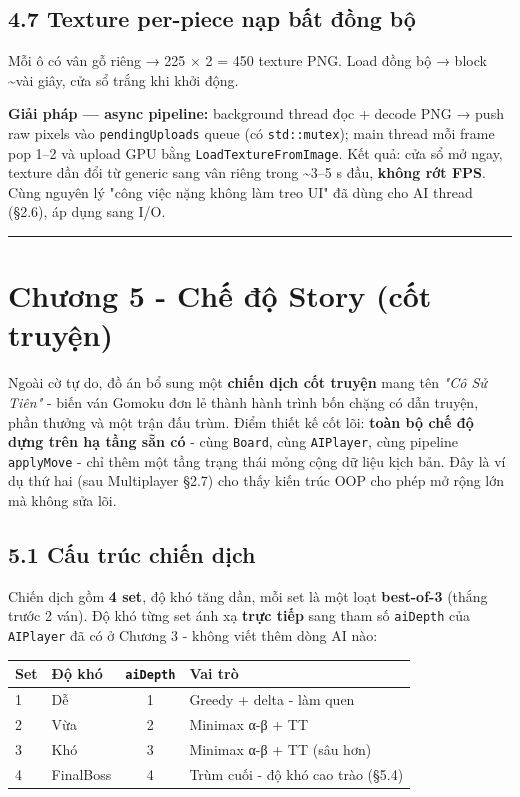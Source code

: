 \documentclass[11pt,a4paper]{article}
\begin{document}
\subsection{4.7 Texture per-piece nạp bất đồng bộ}
\label{sec:org3184ddc}

Mỗi ô có vân gỗ riêng → 225 × 2 = 450 texture PNG. Load đồng bộ → block \textasciitilde{}vài giây, cửa sổ trắng khi khởi động.

\textbf{Giải pháp — async pipeline:} background thread đọc + decode PNG → push raw pixels vào \texttt{pendingUploads} queue (có \texttt{std::mutex}); main thread mỗi frame pop 1–2 và upload GPU bằng \texttt{LoadTextureFromImage}. Kết quả: cửa sổ mở ngay, texture dần đổi từ generic sang vân riêng trong \textasciitilde{}3–5 s đầu, \textbf{không rớt FPS}. Cùng nguyên lý "công việc nặng không làm treo UI" đã dùng cho AI thread (§2.6), áp dụng sang I/O.

\noindent\rule{\textwidth}{0.5pt}
\section{Chương 5 - Chế độ Story (cốt truyện)}
\label{sec:story-mode}

Ngoài cờ tự do, đồ án bổ sung một \textbf{chiến dịch cốt truyện} mang tên \emph{"Cô Sử Tiên"} - biến ván Gomoku đơn lẻ thành hành trình bốn chặng có dẫn truyện, phần thưởng và một trận đấu trùm. Điểm thiết kế cốt lõi: \textbf{toàn bộ chế độ dựng trên hạ tầng sẵn có} - cùng \texttt{Board}, cùng \texttt{AIPlayer}, cùng pipeline \texttt{applyMove} - chỉ thêm một tầng trạng thái mỏng cộng dữ liệu kịch bản. Đây là ví dụ thứ hai (sau Multiplayer §2.7) cho thấy kiến trúc OOP cho phép mở rộng lớn mà không sửa lõi.

\subsection{5.1 Cấu trúc chiến dịch}
\label{sec:story-structure}

Chiến dịch gồm \textbf{4 set}, độ khó tăng dần, mỗi set là một loạt \textbf{best-of-3} (thắng trước 2 ván). Độ khó từng set ánh xạ \textbf{trực tiếp} sang tham số \texttt{aiDepth} của \texttt{AIPlayer} đã có ở Chương 3 - không viết thêm dòng AI nào:

\begin{center}
\begin{tabularx}{\textwidth}{llcX}
Set & Độ khó & \texttt{aiDepth} & Vai trò\\
\hline
1 & Dễ & 1 & Greedy + delta - làm quen\\
2 & Vừa & 2 & Minimax α-β + TT\\
3 & Khó & 3 & Minimax α-β + TT (sâu hơn)\\
4 & FinalBoss & 4 & Trùm cuối - độ khó cao trào (§5.4)\\
\end{tabularx}
\end{center}
\end{document}
